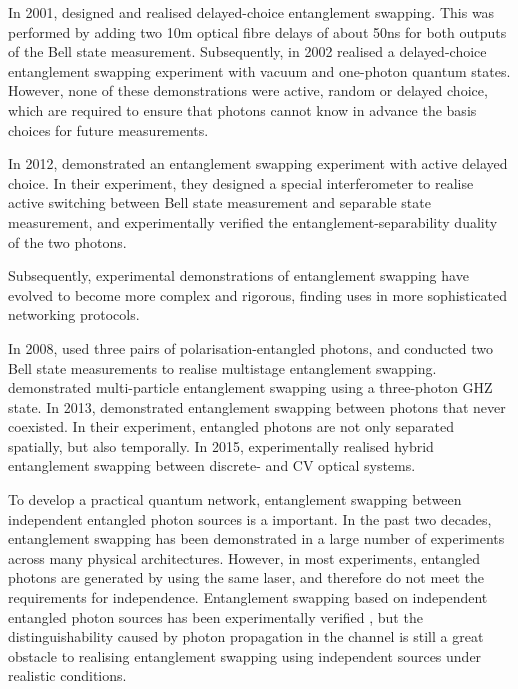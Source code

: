 In 2001, \cite{bib:PRL_88_017903} designed and realised delayed-choice entanglement swapping. This was performed by adding two 10m optical fibre delays of about 50ns for both outputs of the Bell state measurement. Subsequently, in 2002 \cite{bib:PRA_66_024309} realised a delayed-choice entanglement swapping experiment with vacuum and one-photon quantum states. However, none of these demonstrations were active, random or delayed choice, which are required to ensure that photons cannot know in advance the basis choices for future measurements.

In 2012, \cite{bib:Nat_Phys_8_479} demonstrated an entanglement swapping experiment with active delayed choice. In their experiment, they designed a special interferometer to realise active switching between Bell state measurement and separable state measurement, and experimentally verified the entanglement-separability duality of the two photons. 

Subsequently, experimental demonstrations of entanglement swapping have evolved to become more complex and rigorous, finding uses in more sophisticated networking protocols.

In 2008, \cite{bib:goebel08} used three pairs of polarisation-entangled photons, and conducted two Bell state measurements to realise multistage entanglement swapping. \cite{bib:PRL_103_020501} demonstrated multi-particle entanglement swapping using a three-photon GHZ state. In 2013, \cite{bib:PRL_110_210403} demonstrated entanglement swapping between photons that never coexisted. In their experiment, entangled photons are not only separated spatially, but also temporally. In 2015, \cite{bib:PRL_114_100501} experimentally realised hybrid entanglement swapping between discrete- and CV optical systems.

To develop a practical quantum network, entanglement swapping between independent entangled photon sources is a important. In the past two decades, entanglement swapping has been demonstrated in a large number of experiments across many physical architectures. However, in most experiments, entangled photons are generated by using the same laser, and therefore do not meet the requirements for independence. Entanglement swapping based on independent entangled photon sources has been experimentally verified \cite{bib:PRL_96_110501, bib:Nat_Phys_3_692, bib:PRA_79_040302}, but the distinguishability caused by photon propagation in the channel is still a great obstacle to realising entanglement swapping using independent sources under realistic conditions.

